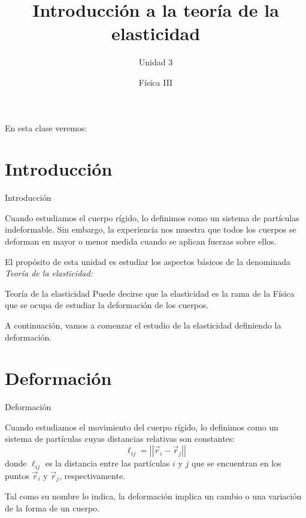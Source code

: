 \documentclass[11pt,handout,aspectratio=1610]{beamer}
\title{Introducción a la teoría de la elasticidad}
\subtitle{Unidad 3}
\author{Física III}
\institute{Instituto de Tecnología e Ingeniería \\ \vspace{0.25cm} Universidad Nacional de Hurlingham}
\date{ }
\newcommand{\norm}[1]{\left\vert\left\vert #1 \right\vert\right\vert}
\newcommand{\vs}{\vspace{11pt}}
\begin{document}
\frame{\titlepage}

\begin{frame}{En esta clase veremos:}
    \tableofcontents
\end{frame}

\section{Introducción}

\begin{frame}{Introducción}

    Cuando estudiamos el cuerpo rígido, lo definimos como un sistema de partículas indeformable. Sin embargo, la experiencia nos muestra que todos los cuerpos se deforman en mayor o menor medida cuando se aplican fuerzas sobre ellos.

    \vs

    El propósito de esta unidad es estudiar los aspectos básicos de la denominada \emph{Teoría de la elasticidad:}

    \begin{block}{Teoría de la elasticidad}
        Puede decirse que la elasticidad es la rama de la Física que se ocupa de estudiar la deformación de los cuerpos.
    \end{block}

    A continuación, vamos a comenzar el estudio de la elasticidad definiendo la deformación.

\end{frame}

\section{Deformación}

\begin{frame}{Deformación}

    Cuando estudiamos el movimiento del cuerpo rígido, lo definimos como un sistema de partículas cuyas distancias relativas son constantes: $$ \ell_{ij} = \norm{\vec{r}_i - \vec{r}_j} $$ donde $\ell_{ij}$ es la distancia entre las partículas $i$ y $j$ que se encuentran en los puntos $\vec{r}_i$ y $\vec{r}_j$, respectivamente. 

    \vs 


    Tal como su nombre lo indica, la deformación implica un cambio o una variación de la forma de un cuerpo.

\end{frame}
\end{document}
